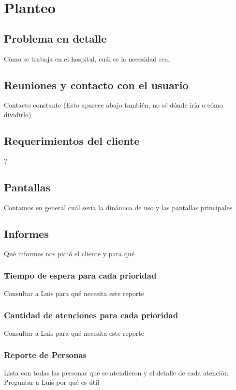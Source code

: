 \section{Planteo}
\subsection{Problema en detalle}
Cómo se trabaja en el hospital, cuál es la necesidad real
\subsection{Reuniones y contacto con el usuario}
Contacto constante (Esto aparece abajo también, no sé dónde iría o cómo dividirlo)
\subsection{Requerimientos del cliente}
?
\subsection{Pantallas}
Contamos en general cuál sería la dinámica de uso y las pantallas principales
\subsection{Informes}
Qué informes nos pidió el cliente y para qué
\subsubsection{Tiempo de espera para cada prioridad}
Consultar a Luis para qué necesita este reporte
\subsubsection{Cantidad de atenciones para cada prioridad}
Consultar a Luis para qué necesita este reporte
\subsubsection{Reporte de Personas}
Lista con todas las personas que se atendieron y el detalle de cada atención. Preguntar a Luis por qué es útil